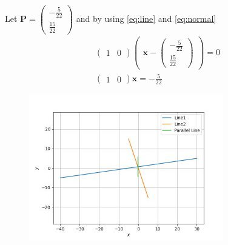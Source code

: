 \documentclass[12pt]{article}
\newcommand{\myvec}[1]{\ensuremath{\begin{pmatrix}#1\end{pmatrix}}}
\let\vec\mathbf
\begin{document}
Let $\vec{P}=\myvec{-\frac{5}{22}\\[1pt] \frac{15}{22}}$ and by using \eqref{eq:line} and \eqref{eq:normal}
\begin{align}
    \myvec{1&0}\myvec{\vec{x}-\myvec{-\frac{5}{22}\\[1pt] \frac{15}{22}}}=0\\
    \myvec{1&0}\vec{x}=-\frac{5}{22}
\end{align}
\begin{figure}[H]
  \begin{center} 
      \includegraphics[width=\columnwidth]{figs/line fig.png}
  \end{center}
\caption{}
\label{fig:Fig3}
\end{figure}
\end{document}
